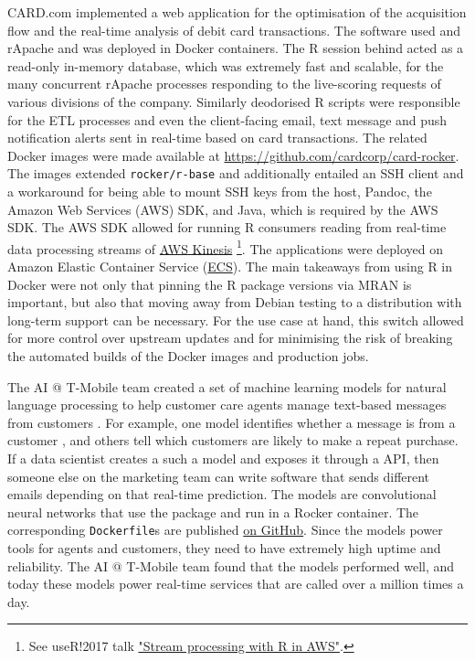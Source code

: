 CARD.com implemented a web application for the optimisation of the
acquisition flow and the real-time analysis of debit card transactions.
The software used  and rApache and was deployed in Docker
containers. The R session behind  acted as a read-only
in-memory database, which was extremely fast and scalable, for the many
concurrent rApache processes responding to the live-scoring requests of
various divisions of the company. Similarly deodorised R scripts were
responsible for the ETL processes and even the client-facing email, text
message and push notification alerts sent in real-time based on card
transactions. The related Docker images were made available at
\url{https://github.com/cardcorp/card-rocker}. The images extended
\texttt{rocker/r-base} and additionally entailed an SSH client and a
workaround for being able to mount SSH keys from the host, Pandoc, the
Amazon Web Services (AWS) SDK, and Java, which is required by the AWS
SDK. The AWS SDK allowed for running R consumers reading from real-time
data processing streams of \href{https://aws.amazon.com/kinesis/}{AWS
Kinesis}
\footnote{See useR!2017 talk \href{https://static.sched.com/hosted\_files/user2017/2f/AWR Kinesis at useR 2017.pdf}{"Stream processing with R in AWS"}.}.
The applications were deployed on Amazon Elastic Container Service
(\href{https://aws.amazon.com/ecs/}{ECS}). The main takeaways from using
R in Docker were not only that pinning the R package versions via MRAN
is important, but also that moving away from Debian testing to a
distribution with long-term support can be necessary. For the use case
at hand, this switch allowed for more control over upstream updates and
for minimising the risk of breaking the automated builds of the Docker
images and production jobs.

The AI @ T-Mobile team created a set of machine learning models for
natural language processing to help customer care agents manage
text-based messages from customers \citep{t-mobile_enterprise_2018}. For
example, one model identifies whether a message is from a customer
\citep[see -based \href{https://secure.message.t-mobile.com/v1/shiny/is-customer/app/}{demo} further described by ][]{nolis_small_2019},
and others tell which customers are likely to make a repeat purchase. If
a data scientist creates a such a model and exposes it through a
 API, then someone else on the marketing team can write
software that sends different emails depending on that real-time
prediction. The models are convolutional neural networks that use the
 package \citep{cran_keras} and run in a Rocker
container. The corresponding \texttt{Dockerfile}s are published
\href{https://github.com/tmobile/r-tensorflow-api}{on GitHub}. Since the
models power tools for agents and customers, they need to have extremely
high uptime and reliability. The AI @ T-Mobile team found that the
models performed well, and today these models power real-time services
that are called over a million times a day.

